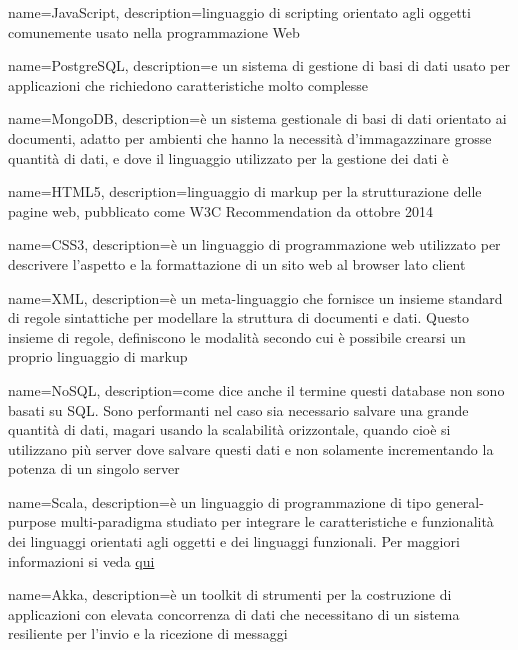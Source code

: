  {
	name=JavaScript,
	description={linguaggio di scripting orientato agli oggetti comunemente usato nella programmazione Web}
}

 {
	name=PostgreSQL,
	description={e un sistema di gestione di basi di dati  usato per applicazioni che richiedono caratteristiche molto complesse }
}

 {
	name=MongoDB,
	description={è un sistema gestionale di basi di dati  orientato ai documenti, adatto per ambienti che hanno la necessità d'immagazzinare grosse quantità di dati, e dove il linguaggio utilizzato per la gestione dei dati è }
}

 {
	name=HTML5,
	description={linguaggio di markup per la strutturazione delle pagine web, pubblicato come W3C Recommendation da ottobre 2014}
}

 {
	name=CSS3,
	description={è un linguaggio di programmazione web utilizzato per descrivere l'aspetto e la formattazione di un sito web al browser lato client}
}

 {
	name=XML,
	description={è un meta-linguaggio che fornisce un insieme standard di regole sintattiche per modellare la struttura di documenti e dati. Questo insieme di regole, definiscono le modalità secondo cui è possibile crearsi un proprio linguaggio di markup}
}

 {
	name=NoSQL,
	description={come dice anche il termine questi database non sono basati su SQL. Sono performanti nel caso sia necessario salvare una grande quantità di dati, magari usando la scalabilità orizzontale, quando cioè si utilizzano più server dove salvare questi dati e non solamente incrementando la potenza di un singolo server}
}

 {
	name=Scala,
	description={è un linguaggio di programmazione di tipo general-purpose multi-paradigma studiato per integrare le caratteristiche e funzionalità dei linguaggi orientati agli oggetti e dei linguaggi funzionali. Per maggiori informazioni si veda \href{https://it.wikipedia.org/wiki/Scala_(linguaggio_di_programmazione)}{qui}}
}

 {
	name=Akka,
	description={è un toolkit di strumenti per la costruzione di applicazioni con elevata concorrenza di dati che necessitano di un sistema resiliente per l'invio e la ricezione di messaggi}
}

